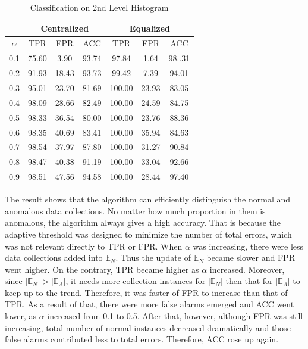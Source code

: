 \documentclass[10pt,conference,letterpaper]{IEEEtran}
\begin{document}
			\begin{table}[!ht]
				\centering
				\caption{Classification on 2nd Level Histogram}
				\label{tab:syn-result-2nd}
				\begin{tabular}{|c|c|c|c|c|c|c|}
					\hline
					& \multicolumn{3}{c|}{Centralized} & \multicolumn{3}{c|}{Equalized}\\
					\hline
					$\alpha$ & TPR & FPR & ACC & TPR & FPR & ACC \\ 
					\hline
					0.1 & 75.60 & 3.90 & 93.74 & 97.84 & 1.64 & 98..31 \\ 
					\hline
					0.2 & 91.93 & 18.43 & 93.73 & 99.42 & 7.39 & 94.01 \\ 
					\hline
					0.3 & 95.01 & 23.70 & 81.69 & 100.00 & 23.93 & 83.05 \\ 
					\hline
					0.4 & 98.09 & 28.66 & 82.49 & 100.00 & 24.59 & 84.75 \\ 
					\hline
					0.5 & 98.33 & 36.54 & 80.00 & 100.00 & 23.76 & 88.36 \\ 
					\hline
					0.6 & 98.35 & 40.69 & 83.41 & 100.00 & 35.94 & 84.63 \\ 
					\hline
					0.7 & 98.54 & 37.97 & 87.80 & 100.00 & 31.27 & 90.84 \\ 
					\hline
					0.8 & 98.47 & 40.38 & 91.19 & 100.00 & 33.04 & 92.66 \\ 
					\hline
					0.9 & 98.51 & 47.56 & 94.58 & 100.00 & 28.44 & 97.40\\
					\hline
				\end{tabular} 
			\end{table}
			
			The result shows that the algorithm can efficiently distinguish the normal and anomalous data collections. No matter how much proportion in them is anomalous, the algorithm always gives a high accuracy. That is because the adaptive threshold was designed to minimize the number of total errors, which was not relevant directly to TPR or FPR. When $\alpha$ was increasing, there were less data collections added into $\mathbb{E}_N$. Thus the update of $\mathbb{E}_N$ became slower and FPR went higher. On the contrary, TPR became higher as $\alpha$ increased. Moreover, since $|\mathbb{E}_N| > |\mathbb{E}_A|$, it needs more collection instances for $|\mathbb{E}_N|$ then that for $|\mathbb{E}_A|$ to keep up to the trend. Therefore, it was faster of FPR to increase than that of TPR. As a result of that, there were more false alarms emerged and ACC went lower, as $\alpha$ increased from 0.1 to 0.5. After that, however, although FPR was still increasing, total number of normal instances decreased dramatically and those false alarms contributed less to total errors. Therefore, ACC rose up again.
	
\end{document}
